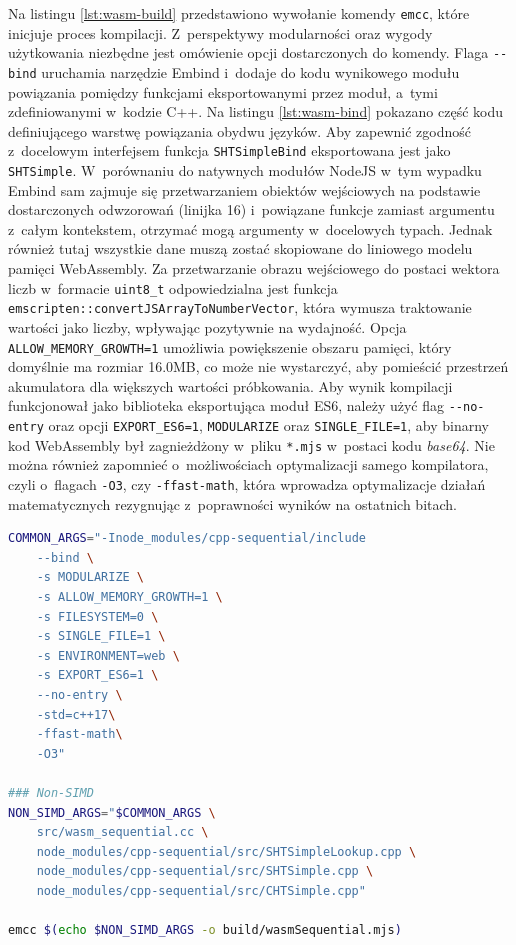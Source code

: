 Na listingu \ref{lst:wasm-build} przedstawiono wywołanie komendy \lstinline{emcc}, które inicjuje proces kompilacji. Z~perspektywy modularności oraz wygody użytkowania niezbędne jest omówienie opcji dostarczonych do komendy. Flaga \lstinline{--bind} uruchamia narzędzie Embind i~dodaje do kodu wynikowego modułu powiązania pomiędzy funkcjami eksportowanymi przez moduł, a~tymi zdefiniowanymi w~kodzie C++. Na listingu \ref{lst:wasm-bind} pokazano część kodu definiującego warstwę powiązania obydwu języków. Aby zapewnić zgodność z~docelowym interfejsem funkcja \lstinline{SHTSimpleBind} eksportowana jest jako \lstinline{SHTSimple}. W~porównaniu do natywnych modułów NodeJS w~tym wypadku Embind sam zajmuje się przetwarzaniem obiektów wejściowych na podstawie dostarczonych odwzorowań (linijka 16) i~powiązane funkcje zamiast argumentu z~całym kontekstem, otrzymać mogą argumenty w~docelowych typach. Jednak również tutaj wszystkie dane muszą zostać skopiowane do liniowego modelu pamięci WebAssembly. Za przetwarzanie obrazu wejściowego do postaci wektora liczb w~formacie \lstinline{uint8_t} odpowiedzialna jest funkcja \lstinline{emscripten::convertJSArrayToNumberVector}, która wymusza traktowanie wartości jako liczby, wpływając pozytywnie na wydajność. Opcja \lstinline{ALLOW_MEMORY_GROWTH=1} umożliwia powiększenie obszaru pamięci, który domyślnie ma rozmiar 16.0MB, co może nie wystarczyć, aby pomieścić przestrzeń akumulatora dla większych wartości próbkowania. Aby wynik kompilacji funkcjonował jako biblioteka eksportująca moduł ES6, należy użyć flag \lstinline{--no-entry} oraz opcji \lstinline{EXPORT_ES6=1}, \lstinline{MODULARIZE} oraz \lstinline{SINGLE_FILE=1}, aby binarny kod WebAssembly był zagnieżdżony w~pliku \lstinline{*.mjs} w~postaci kodu \textit{base64}. Nie można również zapomnieć o~możliwościach optymalizacji samego kompilatora, czyli o~flagach \lstinline{-O3}, czy \lstinline{-ffast-math}, która wprowadza optymalizacje działań matematycznych rezygnując z~poprawności wyników na ostatnich bitach.

\begin{lstlisting}[language=bash, float=ht, label=lst:wasm-build, caption=Komenda wykorzystana podczas kompilacji kodu C++ do modułu WebAssembly., showstringspaces=false]
COMMON_ARGS="-Inode_modules/cpp-sequential/include 
    --bind \
    -s MODULARIZE \
    -s ALLOW_MEMORY_GROWTH=1 \
    -s FILESYSTEM=0 \
    -s SINGLE_FILE=1 \
    -s ENVIRONMENT=web \
    -s EXPORT_ES6=1 \
    --no-entry \
    -std=c++17\
    -ffast-math\
    -O3"

### Non-SIMD
NON_SIMD_ARGS="$COMMON_ARGS \
    src/wasm_sequential.cc \
    node_modules/cpp-sequential/src/SHTSimpleLookup.cpp \
    node_modules/cpp-sequential/src/SHTSimple.cpp \
    node_modules/cpp-sequential/src/CHTSimple.cpp"

emcc $(echo $NON_SIMD_ARGS -o build/wasmSequential.mjs)
\end{lstlisting}

